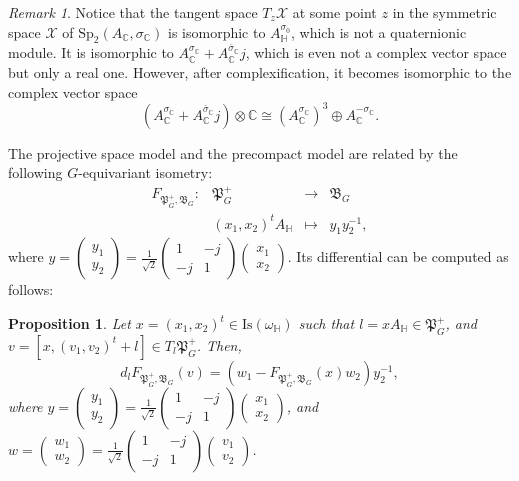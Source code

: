 \documentclass[oneside,11pt]{amsart}
\newtheorem{prop}[thm]{Proposition}
\theoremstyle{definition}
\theoremstyle{remark}
\newtheorem{rem}[thm]{Remark}
\numberwithin{thm}{section}
\numberwithin{equation}{section}
\begin{document}
\begin{rem}\label{rem:not_quatern_module}
    Notice that the tangent space $T_z\mathcal X$ at some point $z$ in the symmetric space $\mathcal{X}$ of $\mathrm{Sp}_2(A_{\mathbb{C}}, \sigma_{\mathbb{C}})$  is isomorphic to $A_\mathbb H^{\sigma_0}$, which is not a quaternionic module. It is isomorphic to $A_\mathbb C^{\sigma_\mathbb C}+ A_\mathbb C^{\bar\sigma_\mathbb C}j$, which is even not a complex vector space but only a real one. However, after complexification, it becomes isomorphic to the complex vector space 
    \[\left(A_{\mathbb{C}}^{\sigma_{\mathbb{C}}} + A_{\mathbb{C}}^{\bar\sigma_{\mathbb{C}}}j\right) \otimes \mathbb{C}\cong (A_{\mathbb{C}}^{\sigma_{\mathbb{C}}})^3\oplus A_{\mathbb{C}}^{-\sigma_{\mathbb{C}}}.\]  
\end{rem}

The projective space model and the precompact model are related by the following $G$-equivariant isometry: 
$$\begin{matrix}
F_{\mathfrak{P}_G^+,\mathfrak{B}_G} \colon & \mathfrak{P}_G^+ & \to & \mathfrak{B}_G\\
 & (x_1,x_2)^tA_\mathbb H & \mapsto & y_1y_2^{-1},
\end{matrix}$$
where $y=\begin{pmatrix}y_1 \\y_2\end{pmatrix}=\frac{1}{\sqrt{2}}\begin{pmatrix}
1 & -j \\
-j & 1
\end{pmatrix}\begin{pmatrix}x_1 \\x_2\end{pmatrix}$. Its differential can be computed as follows:

\begin{prop}
    Let $x=(x_1,x_2)^t\in\mathrm{Is}(\omega_\mathbb H)$ such that $l=xA_\mathbb H\in \mathfrak{P}_G^+$, and $v=[x,(v_1,v_2)^t+l]\in T_{l}\mathfrak{P}_G^+$. Then, 
    $$d_{l}F_{\mathfrak{P}_G^+,\mathfrak{B}_G}(v)=(w_1-F_{\mathfrak{P}_G^+,\mathfrak{B}_G}(x) w_2)y_2^{-1},$$
    where $y=\begin{pmatrix}y_1 \\y_2\end{pmatrix}=\frac{1}{\sqrt{2}}\begin{pmatrix}
1 & -j \\
-j & 1
\end{pmatrix}\begin{pmatrix}x_1 \\x_2\end{pmatrix}$, and $w=\begin{pmatrix}w_1 \\w_2\end{pmatrix}=\frac{1}{\sqrt{2}}\begin{pmatrix}
1 & -j \\
-j & 1
\end{pmatrix}\begin{pmatrix}v_1 \\v_2\end{pmatrix}$.
\end{prop}
\end{document}
